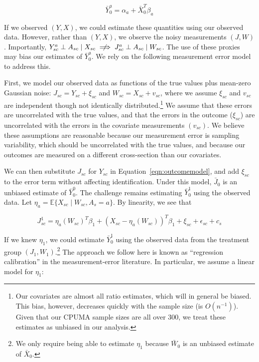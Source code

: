 \documentclass[aoas]{imsart}
\theoremstyle{plain}
\theoremstyle{remark}
\begin{document}
\begin{equation}
\bar{Y}_0^a = \alpha_a + \bar{X}_0^T\beta_a    
\end{equation}

If we observed $(Y, X)$, we could estimate these quantities using our observed data. However, rather than $(Y, X)$, we observe the noisy measurements $(J, W)$. Importantly, $Y_{sc}^a \perp A_{sc} \mid X_{sc} \centernot\implies J_{sc}^a \perp A_{sc} \mid W_{sc}$. The use of these proxies may bias our estimates of $\bar{Y}_0^a$. We rely on the following measurement error model to address this.

First, we model our observed data as functions of the true values plus mean-zero Gaussian noise: $J_{sc} = Y_{sc} + \xi_{sc}$ and $W_{sc} = X_{sc} + v_{sc}$, where we assume $\xi_{sc}$ and $v_{sc}$ are independent though not identically distributed.\footnote{Our covariates are almost all ratio estimates, which will in general be biased. This bias, however, decreases quickly with the sample size (is $O(n^{-1})$). Given that our CPUMA sample sizes are all over 300, we treat these estimates as unbiased in our analysis.} We assume that these errors are uncorrelated with the true values, and that the errors in the outcome ($\xi_{sc}$) are uncorrelated with the errors in the covariate measurements $(v_{sc})$. We believe these assumptions are reasonable because our measurement error is sampling variability, which should be uncorrelated with the true values, and because our outcomes are measured on a different cross-section than our covariates. 

We can then substitute $J_{sc}$ for $Y_{sc}$ in Equation~\ref{eqn:outcomemodel}, and add $\xi_{sc}$ to the error term without affecting identification. Under this model, $\bar{J}_0$ is an unbiased estimate of $\bar{Y}_0^0$. The challenge remains estimating $\bar{Y}_0^1$ using the observed data. Let $\eta_a = \mathbb{E}\{X_{sc} \mid W_{sc}, A_s = a\}$. By linearity, we see that

\begin{equation}
    J_{sc}^1 = \eta_a(W_{sc})^T\beta_1 + (X_{sc} - \eta_a(W_{sc}))^T\beta_1 + \xi_{sc} + \epsilon_{sc} + c_s 
\end{equation}

If we knew $\eta_1$, we could estimate $\bar{Y}_0^1$ using the observed data from the treatment group $(J_1, W_1)$.\footnote{We only require being able to estimate $\eta_1$ because $\bar{W}_0$ is an unbiased estimate of $\bar{X}_0$.} The approach we follow here is known as ``regression calibration'' in the measurement-error literature. In particular, we assume a linear model for $\eta_1$:
\end{document}
